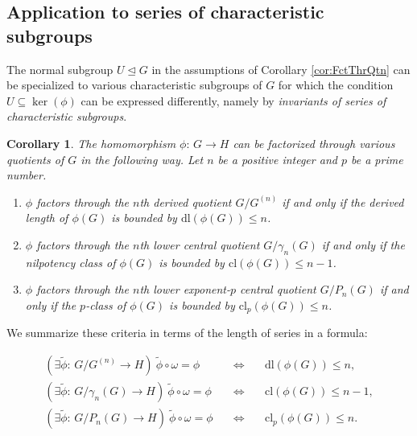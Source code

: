 \documentclass{amsart}
\newtheorem{corollary}{Corollary}[section]
\theoremstyle{definition}
\numberwithin{equation}{section}
\begin{document}
\subsection{Application to series of characteristic subgroups}
\label{ss:SerCharSbg}

\noindent
The normal subgroup \(U\unlhd G\) in the assumptions of Corollary
\ref{cor:FctThrQtn}
can be specialized to various characteristic subgroups of \(G\)
for which the condition \(U\subseteq\ker(\phi)\) can be expressed differently,
namely by \textit{invariants of series of characteristic subgroups}.


\begin{corollary}
\label{cor:CharSbg}
The homomorphism \(\phi:\,G\to H\) can be factorized
through various quotients of \(G\) in the following way.
Let \(n\) be a positive integer and \(p\) be a prime number.

\begin{enumerate}
\item
\(\phi\) factors through the \(n\)th derived quotient \(G/G^{(n)}\)
if and only if the derived length of \(\phi(G)\) is bounded by \(\mathrm{dl}(\phi(G))\le n\).
\item
\(\phi\) factors through the \(n\)th lower central quotient \(G/\gamma_n(G)\)
if and only if the nilpotency class of \(\phi(G)\) is bounded by \(\mathrm{cl}(\phi(G))\le n-1\).
\item
\(\phi\) factors through the \(n\)th lower exponent-\(p\) central quotient \(G/P_n(G)\)
if and only if  the \(p\)-class of \(\phi(G)\) is bounded by \(\mathrm{cl}_p(\phi(G))\le n\).
\end{enumerate}
\end{corollary}


\noindent
We summarize these criteria in terms of the length of series in a formula:

\begin{equation}
\label{eqn:CharSbg}
\begin{aligned}
(\exists\tilde{\phi}:\,G/G^{(n)}\to H)\ \tilde{\phi}\circ\omega=\phi
&\quad\Longleftrightarrow\quad& \mathrm{dl}(\phi(G))\le n,\\
(\exists\tilde{\phi}:\,G/\gamma_n(G)\to H)\ \tilde{\phi}\circ\omega=\phi
&\quad\Longleftrightarrow\quad& \mathrm{cl}(\phi(G))\le n-1, \\
(\exists\tilde{\phi}:\,G/P_n(G)\to H)\ \tilde{\phi}\circ\omega=\phi
&\quad\Longleftrightarrow\quad& \mathrm{cl}_p(\phi(G))\le n.
\end{aligned}
\end{equation}
\end{document}
